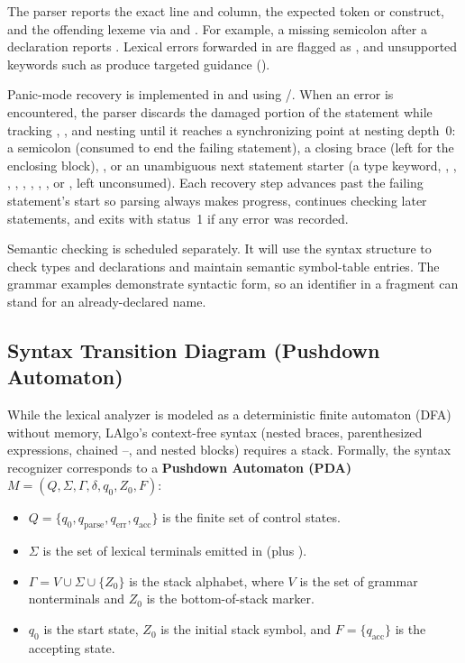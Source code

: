 The parser reports the exact line and column, the expected token or construct, and the offending lexeme via  and . For example, a missing semicolon after a declaration reports . Lexical errors forwarded in  are flagged as , and unsupported keywords such as  produce targeted guidance ().

Panic-mode recovery is implemented in  and  using /. When an error is encountered, the parser discards the damaged portion of the statement while tracking \codeinline{(}, \codeinline{[}, and \codeinline{\{} nesting until it reaches a synchronizing point at nesting depth~0: a semicolon (consumed to end the failing statement), a closing brace (left for the enclosing block), , or an unambiguous next statement starter (a type keyword, , , , , , , , , or , left unconsumed). Each recovery step advances past the failing statement's start so parsing always makes progress, continues checking later statements, and exits with status~1 if any error was recorded.

Semantic checking is scheduled separately. It will use the syntax structure to check types and declarations and maintain semantic symbol-table entries. The grammar examples demonstrate syntactic form, so an identifier in a fragment can stand for an already-declared name.

\subsection{Syntax Transition Diagram (Pushdown Automaton)}
\label{sec:syntax-pda}

While the lexical analyzer is modeled as a deterministic finite automaton (DFA) without memory, LAlgo's context-free syntax (nested braces, parenthesized expressions, chained --, and nested  blocks) requires a stack. Formally, the syntax recognizer corresponds to a \textbf{Pushdown Automaton (PDA)} $M = (Q, \Sigma, \Gamma, \delta, q_0, Z_0, F)$:
\begin{itemize}
  \item $Q = \{q_0, q_{\mathrm{parse}}, q_{\mathrm{err}}, q_{\mathrm{acc}}\}$ is the finite set of control states.
  \item $\Sigma$ is the set of lexical terminals emitted in  (plus ).
  \item $\Gamma = V \cup \Sigma \cup \{Z_0\}$ is the stack alphabet, where $V$ is the set of grammar nonterminals and $Z_0$ is the bottom-of-stack marker.
  \item $q_0$ is the start state, $Z_0$ is the initial stack symbol, and $F = \{q_{\mathrm{acc}}\}$ is the accepting state.
\end{itemize}

